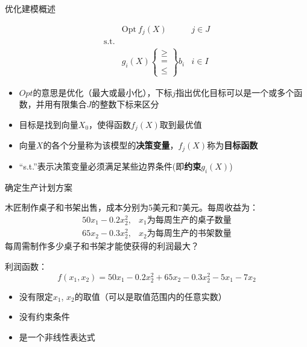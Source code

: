 \documentclass[UTF8]{ctexbeamer}
\begin{document}
\begin{frame}{优化建模概述}

  \begin{block}{}
    \[ 
    \begin{array}{lcl}
      & \mbox{Opt}\ f_j(X) & j \in J\\
      \mbox{s.t.} & &  \\
      &
      g_i(X) \left\{
        \begin{array}{c}
          \ge\\
          = \\
          \le
        \end{array}
      \right\} b_i& i \in I
    \end{array}
    \]
  \end{block}
  \begin{itemize}
  \item $Opt$的意思是优化（最大或最小化），下标$j$指出优化目标可以是一个或多个函数，并用有限集合$J$的整数下标来区分
  \item 目标是找到向量$X_0$，使得函数$f_j(X)$取到最优值
  \item 向量$X$的各个分量称为该模型的\textbf{决策变量}，$f_j(X)$称为\textbf{目标函数}
  \item ``s.t.''表示决策变量必须满足某些边界条件(即\textbf{约束}$g_i(X)$)
  \end{itemize}
  
\end{frame}

\begin{frame}{确定生产计划方案}
  \begin{block}{}
    木匠制作桌子和书架出售，成本分别为5美元和7美元。每周收益为：
    \[
    \begin{array}{cc}
      50x_1 - 0.2x_2^2, & x_1\text{为每周生产的桌子数量}\\
      65x_2 - 0.3x_2^2, & x_2\text{为每周生产的书架数量}
    \end{array}
    \]
    每周需制作多少桌子和书架才能使获得的利润最大？
  \end{block}
  
  利润函数：
  \[
  f(x_1, x_2) = 50x_1 - 0.2x_2^2 + 65x_2 - 0.3x_2^2 - 5x_1 - 7x_2
  \]

  \begin{itemize}
  \item 没有限定$x_1$, $x_2$的取值（可以是取值范围内的任意实数）
  \item 没有约束条件
  \item 是一个非线性表达式
  \end{itemize}
  
\end{frame}
\end{document}
